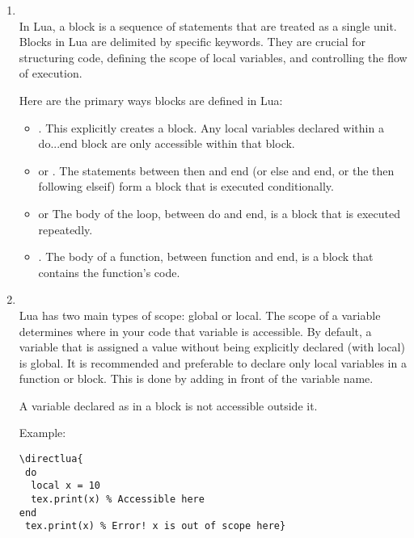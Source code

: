 \begin{enumerate}

  \item  {}\\
In Lua, a block is a sequence of statements that are treated as a single unit. Blocks in Lua are delimited by specific keywords. They are crucial for structuring code, defining the scope of local variables, and controlling the flow of execution.

Here are the primary ways blocks are defined in Lua:

\begin{itemize}
  \item {}. This explicitly creates a block. Any local variables declared within a do...end block are only accessible within that block.

  \item {} or . The statements between then and end (or else and end, or the then following elseif) form a block that is executed conditionally.

\item {} or  The body of the loop, between do and end, is a block that is executed repeatedly.

\item {}. The body of a function, between function and end, is a block that contains the function's code.
\end{itemize}


\item {}\\
Lua has two main types of scope: global or local. The scope of a variable determines where in your code that variable is accessible. By default, a variable that is assigned a value without being explicitly declared (with local) is global. It is recommended and preferable to declare only local variables in a function or block. This is done by adding  in front of the variable name.

A variable declared as  in a block is not accessible outside it.

Example:

\begin{mybox}
\begin{verbatim}
\directlua{
 do
  local x = 10
  tex.print(x) % Accessible here
end
 tex.print(x) % Error! x is out of scope here}
\end{verbatim}
\end{mybox}
\end{enumerate}

